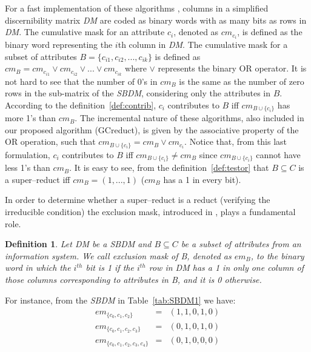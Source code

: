 \documentclass[number,preprint,review,12pt]{elsarticle}
\newtheorem{definition}{Definition}
\begin{document}
	For a fast implementation of these algorithms \citep{Sanchez10,Lias13}, columns in a simplified discernibility matrix \textit{DM} are coded as binary words with as many bits as rows in \textit{DM}. The cumulative mask for an attribute $c_i$, denoted as $cm_{c_i}$, is defined as the binary word representing the $i$th column in \textit{DM}. The cumulative mask for a subset of attributes $B=\lbrace c_{i1},c_{i2},...,c_{ik} \rbrace$ is defined	as $cm_B = cm_{c_{i1}} \vee cm_{c_{i2}} \vee ... \vee cm_{c_{ik}}$ where $\vee$ represents the binary OR operator. It is not hard to see that the number of 0's in $cm_B$ is the same as the number of zero rows in the sub-matrix of the \textit{SBDM}, considering only the attributes in $B$. According to the definition~\ref{def:contrib}, $c_i$ contributes to $B$ iff $cm_{B\cup \lbrace c_i\rbrace}$ has more 1's than $cm_B$. The incremental nature of these algorithms, also included in  our proposed algorithm (GCreduct), is given by the associative property of the OR operation, such that  $cm_{B\cup \lbrace c_i\rbrace}=cm_B\vee cm_{c_i}$. Notice that, from this last formulation, $c_i$ contributes to $B$ iff $cm_{B\cup \lbrace c_i\rbrace}\neq cm_B$ since $cm_{B\cup \lbrace c_i\rbrace}$ cannot have less 1's than $cm_B$. It is easy to see, from the definition~\ref{def:testor} that $B \subseteq C$ is a super--reduct iff $cm_B=(1,...,1)$ ($cm_B$ has a 1 in every bit).
	
	In order to determine whether a super--reduct is a reduct (verifying the irreducible condition) the
	exclusion mask, introduced in \cite{Lias09}, plays a fundamental role. 
	
	\begin{definition}\label{def:exclusion}
		Let DM be a SBDM and $B \subseteq C$ be a subset of attributes from an information system. We call exclusion mask of B, denoted as $em_B$, to the binary word in which the $i^{\mathit{th}}$ bit is 1 if the $i^{\mathit{th}}$ row in DM has a 1 in only one column of those columns corresponding to attributes in B, and it is 0 otherwise.
	\end{definition}
	
	For instance, from the \textit{SBDM} in Table~\ref{tab:SBDM1} we have:
	$$\begin{array}{lcc}
	  em_{\lbrace c_0,c_1,c_2\rbrace}         &=& (1,1,0,1,0)\\
	  em_{\lbrace c_0,c_1,c_2,c_3\rbrace}     &=& (0,1,0,1,0)\\
	  em_{\lbrace c_0,c_1,c_2,c_3,c_4\rbrace} &=& (0,1,0,0,0)
	\end{array}$$
	
\end{document}

